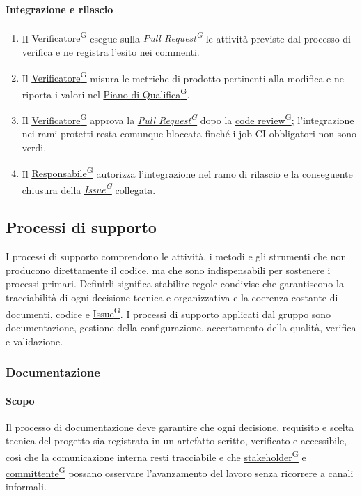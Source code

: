 \documentclass[a4paper,12pt]{article}
\providecommand{\glslink}[2]{\href{https://alittlebyte-19.github.io/Documentazione/glossario.html\#gls-#1}{\underline{#2}\textsuperscript{\scriptsize G}}}
\begin{document}
\paragraph{Integrazione e rilascio}
\begin{enumerate}
    \item Il \glslink{verificatore}{Verificatore} esegue sulla \textit{\glslink{pull-request}{Pull Request}} le attività previste dal processo di verifica e ne registra l'esito nei commenti.
    \item Il \glslink{verificatore}{Verificatore} misura le metriche di prodotto pertinenti alla modifica e ne riporta i valori nel \glslink{piano-di-qualifica}{Piano di Qualifica}.
    \item Il \glslink{verificatore}{Verificatore} approva la \textit{\glslink{pull-request}{Pull Request}} dopo la \glslink{code-review}{code review}; l'integrazione nei rami protetti resta comunque bloccata finché i job CI obbligatori non sono verdi.
    \item Il \glslink{responsabile}{Responsabile} autorizza l'integrazione nel ramo di rilascio e la conseguente chiusura della \textit{\glslink{issue}{Issue}} collegata.
\end{enumerate}

\subsection{Processi di supporto}
I processi di supporto comprendono le attività, i metodi e gli strumenti che non producono direttamente il codice, ma che sono indispensabili per sostenere i processi primari. Definirli significa stabilire regole condivise che garantiscono la tracciabilità di ogni decisione tecnica e organizzativa e la coerenza costante di documenti, codice e \glslink{issue}{Issue}. I processi di supporto applicati dal gruppo sono documentazione, gestione della configurazione, accertamento della qualità, verifica e validazione.

\subsubsection{Documentazione}

\paragraph{Scopo}
Il processo di documentazione deve garantire che ogni decisione, requisito e scelta tecnica del progetto sia registrata in un artefatto scritto, verificato e accessibile, così che la comunicazione interna resti tracciabile e che \glslink{stakeholder}{stakeholder} e \glslink{committente-proponente}{committente} possano osservare l'avanzamento del lavoro senza ricorrere a canali informali.
\end{document}
